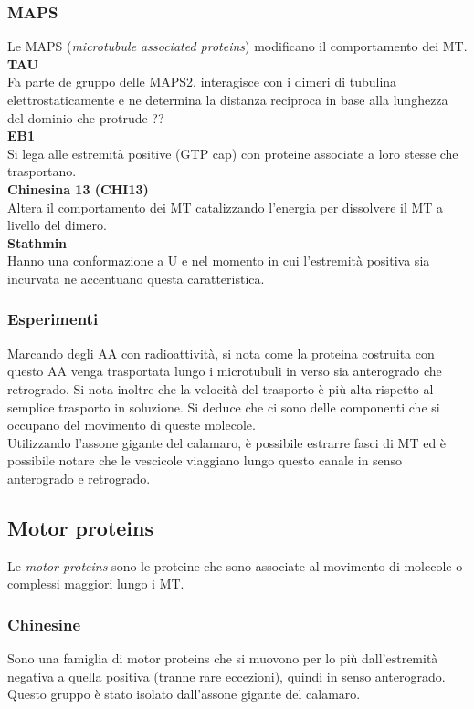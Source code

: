         \subsubsection{MAPS}
            Le MAPS (\textit{microtubule associated proteins}) modificano il comportamento dei MT.\\
            \textbf{TAU}\\
                Fa parte de gruppo delle MAPS2, interagisce con i dimeri di tubulina elettrostaticamente e ne determina la distanza reciproca in base alla lunghezza del dominio che protrude ??\\
            \textbf{EB1}\\
                Si lega alle estremità positive (GTP cap) con proteine associate a loro stesse che trasportano.\\
            \textbf{Chinesina 13 (CHI13)}\\
                Altera il comportamento dei MT catalizzando l'energia per dissolvere il MT a livello del dimero.\\
            \textbf{Stathmin}\\
                Hanno una conformazione a U e nel momento in cui l'estremità positiva sia incurvata ne accentuano questa caratteristica.
        
        \subsubsection{Esperimenti}
            Marcando degli AA con radioattività, si nota come la proteina costruita con questo AA venga trasportata lungo i microtubuli in verso sia anterogrado che retrogrado. Si nota inoltre che la velocità del trasporto è più alta rispetto al semplice trasporto in soluzione. Si deduce che ci sono delle componenti che si occupano del movimento di queste molecole.\\
            Utilizzando l'assone gigante del calamaro, è possibile estrarre fasci di MT ed è possibile notare che le vescicole viaggiano lungo questo canale in senso anterogrado e retrogrado.
        
    \subsection{Motor proteins}
        Le \textit{motor proteins} sono le proteine che sono associate al movimento di molecole o complessi maggiori lungo i MT.
        \subsubsection{Chinesine}
            Sono una famiglia di motor proteins che si muovono per lo più dall'estremità negativa a quella positiva (tranne rare eccezioni), quindi in senso anterogrado. Questo gruppo è stato isolato dall'assone gigante del calamaro.\\
            

